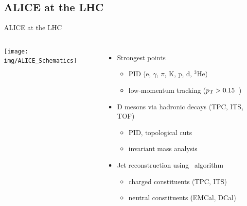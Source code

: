 \documentclass{beamer}
\begin{document}
\subsection{ALICE at the LHC}
\begin{frame}{ALICE at the LHC}
\begin{columns}

\texttt{[image: img/ALICE\_Schematics]}

\begin{itemize}
\item Strongest points
\begin{itemize}
\item \alert{PID} (e, $\gamma$, $\pi$, K, p, d, ${}^3$He)
\item \alert{low-momentum tracking} ($p_{\rm T} > 0.15$~\GeVc)
\end{itemize}
\item \alert{D mesons} via hadronic decays (TPC, ITS, TOF)
\begin{itemize}
\item PID, topological cuts
\item invariant mass analysis
\end{itemize}
\item \alert{Jet reconstruction} using \antikt\ algorithm
\begin{itemize}
\item charged constituents (TPC, ITS)
\item neutral constituents (EMCal, DCal)
\end{itemize}
\end{itemize}
\end{columns}
\end{frame}
\end{document}
